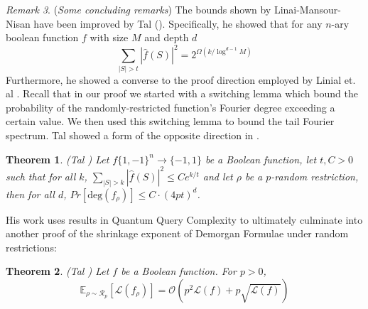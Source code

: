 \documentclass{amsart}
\newtheorem{theorem}{Theorem}[section]
\theoremstyle{definition}
\theoremstyle{remark}
\newtheorem{remark}[theorem]{Remark}
\numberwithin{equation}{section}
\theoremstyle{remark}
\begin{document}
\begin{remark}{(\emph{Some concluding remarks})}
  The bounds shown by Linai-Mansour-Nisan have been improved by Tal (\cite{tal}). Specifically, he showed that for any $n$-ary boolean function $f$ with size $M$ and depth $d$
  \begin{equation}
    \sum_{|S| > t} |\hat{f}(S)|^2 = 2^{\Omega(k/\log^{d-1}{M})}
  \end{equation}
  Furthermore, he showed a converse to the proof direction employed by Linial et. al \cite{lmn}. Recall that in our proof we started with a switching lemma which bound the probability of the randomly-restricted function's Fourier degree exceeding a certain value. We then used this switching lemma to bound the tail Fourier spectrum. Tal showed a form of the opposite direction in \cite{talshrinkage}.
  \begin{theorem}{\emph{(Tal \cite{talshrinkage})}}
    Let $f\{1,-1\}^n \rightarrow \{-1,1\}$ be a Boolean function, let $t,C > 0$ such that for all $k$, $\sum_{|S| > k} |\hat{f}(S)|^2 \leq C e^{k/t}$ and let $\rho$ be a $p$-random restriction, then for all $d$, $Pr[\text{deg}(f_{\rho})] \leq C \cdot (4pt)^d$.
  \end{theorem}
  His work uses results in Quantum Query Complexity to ultimately culminate into another proof of the shrinkage exponent of Demorgan Formulae under random restrictions:
  \begin{theorem}{\emph{(Tal \cite{talshrinkage})}}
    Let $f$ be a Boolean function. For $p > 0$,
    \begin{equation}
      \mathbb{E}_{\rho \sim \mathcal{R}_p}[\mathcal{L}(f_\rho)] = \mathcal{O} \left(p^2\mathcal{L}(f) + p\sqrt{\mathcal{L}(f)} \right)
    \end{equation}
  \end{theorem}
\end{remark}
\newpage


\end{document}
